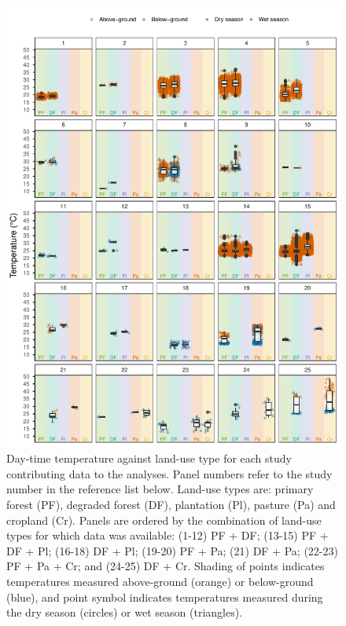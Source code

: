 \documentclass[12pt,a4paper,]{report}
\theoremstyle{definition}
\theoremstyle{definition}
\theoremstyle{definition}
\theoremstyle{remark}
\begin{document}
\begin{figure}
\centering
\includegraphics{./output/fig-A-1-1-1.pdf}
\caption{\label{fig:fig-A-1-1}Day-time temperature against land-use type for
each study contributing data to the analyses. Panel numbers refer to the
study number in the reference list below. Land-use types are: primary
forest (PF), degraded forest (DF), plantation (Pl), pasture (Pa) and
cropland (Cr). Panels are ordered by the combination of land-use types
for which data was available: (1-12) PF + DF; (13-15) PF + DF + Pl;
(16-18) DF + Pl; (19-20) PF + Pa; (21) DF + Pa; (22-23) PF + Pa + Cr;
and (24-25) DF + Cr. Shading of points indicates temperatures measured
above-ground (orange) or below-ground (blue), and point symbol indicates
temperatures measured during the dry season (circles) or wet season
(triangles).}
\end{figure}
\end{document}
